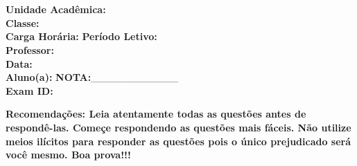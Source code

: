 \documentclass[8pt]{extarticle}
\makeatletter
\newcommand{\myID}{\@ID}
\newcommand{\myDate}{\@Date}
\makeatother
\begin{document}
\pagestyle{fancy} 	
\fancyhead[L]{\textbf{\normalsize }} %
\fancyhead[R]{\myID}
\cfoot{}

\section*{}
\textbf{Unidade Acadêmica:} \\
\textbf{Classe:} \\
\textbf{Carga Horária:} \textbf{Período Letivo:} \\
\textbf{Professor:} \\
\textbf{Data:\myDate}  \\
\textbf{Aluno(a):} \hspace{12cm} \textbf{NOTA:}\_\_\_\_\_\_\_\_\_\_\_\_\ \\
\textbf{Exam ID:} \myID

\vspace{0.3cm}

\textbf{Recomendações: Leia atentamente todas as questões antes de respondê-las. Começe respondendo as questões mais fáceis. Não utilize meios ilícitos para responder as questões pois o único prejudicado será você mesmo. Boa prova!!!}\vspace{0.5cm}

\vspace*{1cm}


\newpage

\begin{enumerate}


\end{enumerate}
\end{document}
